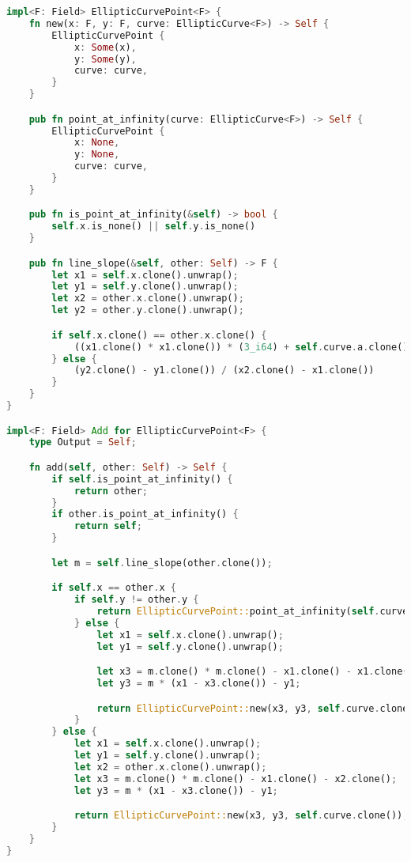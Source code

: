 \documentclass{article}
\begin{document}
\begin{lstlisting}[language=Rust, caption=Implementation of Addition on Elliptic Curve]
impl<F: Field> EllipticCurvePoint<F> {
    fn new(x: F, y: F, curve: EllipticCurve<F>) -> Self {
        EllipticCurvePoint {
            x: Some(x),
            y: Some(y),
            curve: curve,
        }
    }

    pub fn point_at_infinity(curve: EllipticCurve<F>) -> Self {
        EllipticCurvePoint {
            x: None,
            y: None,
            curve: curve,
        }
    }

    pub fn is_point_at_infinity(&self) -> bool {
        self.x.is_none() || self.y.is_none()
    }

    pub fn line_slope(&self, other: Self) -> F {
        let x1 = self.x.clone().unwrap();
        let y1 = self.y.clone().unwrap();
        let x2 = other.x.clone().unwrap();
        let y2 = other.y.clone().unwrap();

        if self.x.clone() == other.x.clone() {
            ((x1.clone() * x1.clone()) * (3_i64) + self.curve.a.clone()) / (y1.clone() * (2_i64))
        } else {
            (y2.clone() - y1.clone()) / (x2.clone() - x1.clone())
        }
    }
}

impl<F: Field> Add for EllipticCurvePoint<F> {
    type Output = Self;

    fn add(self, other: Self) -> Self {
        if self.is_point_at_infinity() {
            return other;
        }
        if other.is_point_at_infinity() {
            return self;
        }

        let m = self.line_slope(other.clone());

        if self.x == other.x {
            if self.y != other.y {
                return EllipticCurvePoint::point_at_infinity(self.curve.clone());
            } else {
                let x1 = self.x.clone().unwrap();
                let y1 = self.y.clone().unwrap();

                let x3 = m.clone() * m.clone() - x1.clone() - x1.clone();
                let y3 = m * (x1 - x3.clone()) - y1;

                return EllipticCurvePoint::new(x3, y3, self.curve.clone());
            }
        } else {
            let x1 = self.x.clone().unwrap();
            let y1 = self.y.clone().unwrap();
            let x2 = other.x.clone().unwrap();
            let x3 = m.clone() * m.clone() - x1.clone() - x2.clone();
            let y3 = m * (x1 - x3.clone()) - y1;

            return EllipticCurvePoint::new(x3, y3, self.curve.clone());
        }
    }
}
\end{lstlisting}
\end{document}
